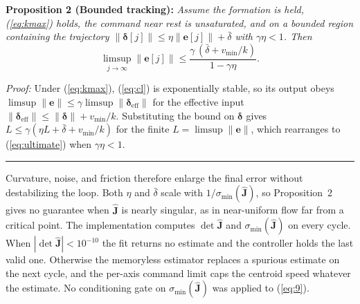 \documentclass[10pt]{article}
\providecommand{\IEEEQED}{\rule{1.3ex}{1.3ex}}
\begin{document}
\smallskip
\noindent\textbf{Proposition 2 (Bounded tracking):} \textit{Assume the formation is held, (\ref{eq:kmax}) holds, the command near rest is unsaturated, and on a bounded region containing the trajectory $\|\boldsymbol{\delta}[j]\| \le \eta\|\mathbf{e}[j]\| + \bar{\delta}$ with $\gamma\eta < 1$. Then}
\begin{equation}\label{eq:ultimate}
\limsup_{j\to\infty} \|\mathbf{e}[j]\| \le \frac{\gamma\,(\bar{\delta} + v_{\min}/k)}{1 - \gamma\eta}.
\end{equation}

\noindent\textit{Proof:} Under (\ref{eq:kmax}), (\ref{eq:cl}) is exponentially stable, so its output obeys $\limsup\|\mathbf{e}\| \le \gamma\limsup\|\boldsymbol{\delta}_{\mathrm{eff}}\|$ for the effective input $\|\boldsymbol{\delta}_{\mathrm{eff}}\| \le \|\boldsymbol{\delta}\| + v_{\min}/k$. Substituting the bound on $\boldsymbol{\delta}$ gives $L \le \gamma(\eta L + \bar{\delta} + v_{\min}/k)$ for the finite $L = \limsup\|\mathbf{e}\|$, which rearranges to (\ref{eq:ultimate}) when $\gamma\eta < 1$. \hfill\IEEEQED

\smallskip
Curvature, noise, and friction therefore enlarge the final error without destabilizing the loop. Both $\eta$ and $\bar{\delta}$ scale with $1/\sigma_{\min}(\hat{\mathbf{J}})$, so Proposition~2 gives no guarantee when $\hat{\mathbf{J}}$ is nearly singular, as in near-uniform flow far from a critical point. The implementation computes $\det\hat{\mathbf{J}}$ and $\sigma_{\min}(\hat{\mathbf{J}})$ on every cycle. When $|\det\hat{\mathbf{J}}| < 10^{-10}$ the fit returns no estimate and the controller holds the last valid one. Otherwise the memoryless estimator replaces a spurious estimate on the next cycle, and the per-axis command limit caps the centroid speed whatever the estimate. No conditioning gate on $\sigma_{\min}(\hat{\mathbf{J}})$ was applied to (\ref{eq:9}).
\end{document}
